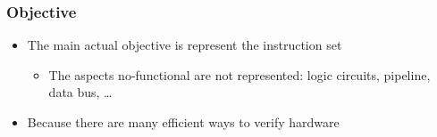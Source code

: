 \begin{frame}
\frametitle{Objective}  

\begin{itemize}[<+->]
  \item The main actual objective is represent the instruction set
    \begin{itemize}
    \item The aspects no-functional are not represented: logic circuits, pipeline, data bus, \ldots 
  \end{itemize}
  \item Because there are many efficient ways to verify hardware

\end{itemize}
% 

\end{frame}



